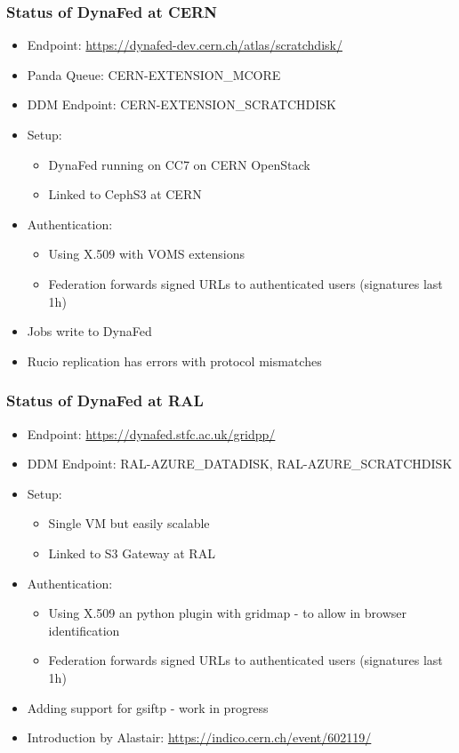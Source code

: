 \documentclass{beamer}
\begin{document}
\begin{frame}
  \frametitle{Status of DynaFed at CERN}
  \begin{itemize}
    \item Endpoint: \url{https://dynafed-dev.cern.ch/atlas/scratchdisk/}
    \item Panda Queue: CERN-EXTENSION\_MCORE
		\item DDM Endpoint: CERN-EXTENSION\_SCRATCHDISK
    \item Setup:
    \begin{itemize}
      \item DynaFed running on CC7 on CERN OpenStack
      \item Linked to CephS3 at CERN
    \end{itemize}
		\item Authentication:
    \begin{itemize}
      \item Using X.509 with VOMS extensions
      \item Federation forwards signed URLs to authenticated users (signatures last 1h)
    \end{itemize}
    \item Jobs write to DynaFed
    \item Rucio replication has errors with protocol mismatches
  \end{itemize}
\end{frame}

\begin{frame}
  \frametitle{Status of DynaFed at RAL}
  \begin{itemize}
    \item Endpoint: \url{https://dynafed.stfc.ac.uk/gridpp/}
		\item DDM Endpoint: RAL-AZURE\_DATADISK, RAL-AZURE\_SCRATCHDISK
    \item Setup:
    \begin{itemize}
      \item Single VM but easily scalable
      \item Linked to S3 Gateway at RAL
    \end{itemize}
		\item Authentication:
    \begin{itemize}
      \item Using X.509 an python plugin with gridmap - to allow in browser identification
      \item Federation forwards signed URLs to authenticated users (signatures last 1h)
    \end{itemize}
    \item Adding support for gsiftp - work in progress
    \item Introduction by Alastair: \url{https://indico.cern.ch/event/602119/}
  \end{itemize}
\end{frame}
\end{document}
